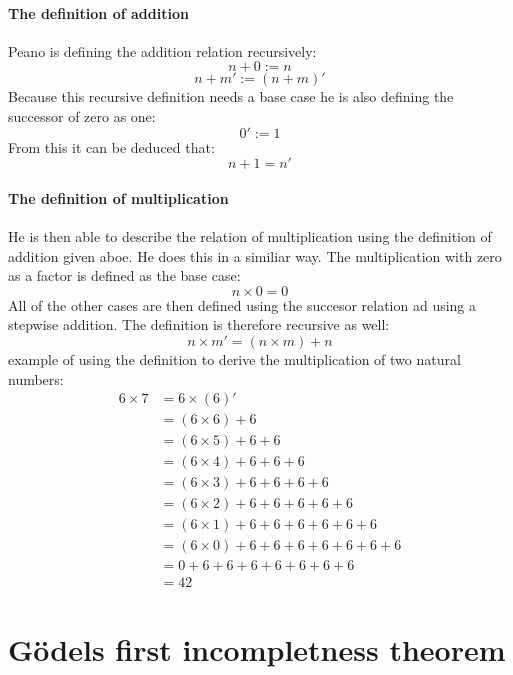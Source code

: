 \documentclass[english,12pt]{article}
\begin{document}
\paragraph{The definition of addition}
Peano is defining the addition relation recursively:
$$
    n + 0 := n
$$
$$
    n + m' := (n + m)' 
$$
Because this recursive definition needs a base case he is also defining the successor of zero as one:
$$
    0' := 1
$$
From this it can be deduced that:
$$
    n + 1 = n'
$$
\paragraph{The definition of multiplication}
He is then able to describe the relation of multiplication using the definition of addition given aboe. He does this in a similiar way. The multiplication with zero as a factor is defined as the base case:
$$
    n \times 0 = 0
$$
All of the other cases are then defined using the succesor relation ad using a stepwise addition. The definition is therefore recursive as well:
$$
    n \times m' = (n \times m) + n
$$
example of using the definition to derive the multiplication of two natural numbers:\\
$$
\begin{aligned}
    6 \times 7 &= 6 \times (6)'\\
    & = (6 \times 6) + 6\\
    & = (6 \times 5) + 6 + 6\\
    & = (6 \times 4) + 6 + 6 + 6\\
    & = (6 \times 3) + 6 + 6 + 6 + 6\\
    & = (6 \times 2) + 6 + 6 + 6 + 6 + 6\\
    & = (6 \times 1) + 6 + 6 + 6 + 6 + 6 + 6\\
    & = (6 \times 0) + 6 + 6 + 6 + 6 + 6 + 6 + 6\\
    & = 0 + 6 + 6 + 6 + 6 + 6 + 6 + 6\\
    & = 42
\end{aligned}
$$
\section{Gödels first incompletness theorem}
\end{document}
